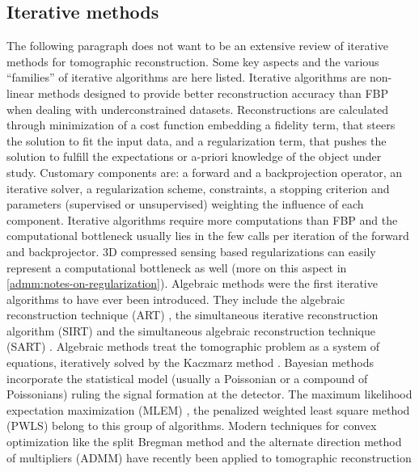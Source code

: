 {\subsection{Iterative methods}
\label{introduction:iterative-reconstruction}
The following paragraph does not want to be an extensive review of iterative methods for tomographic reconstruction. 
Some key aspects and the various ``families'' of iterative algorithms are here listed.
\newline
Iterative algorithms are non-linear methods designed to provide better reconstruction accuracy than FBP
when dealing with underconstrained datasets. Reconstructions are calculated through minimization of a cost function embedding 
a fidelity term, that steers the solution to fit the input data, and a regularization term, that pushes the solution to fulfill the 
expectations or a-priori knowledge of the object under study. Customary components are: a forward and a backprojection operator,
an iterative solver, a regularization scheme, constraints, a stopping criterion and parameters (supervised or unsupervised)
weighting the influence of each component. 
Iterative algorithms require more computations than FBP and the computational bottleneck usually lies in the few calls per iteration of 
the forward and backprojector. 3D compressed sensing based regularizations can easily represent a computational bottleneck as well
(more on this aspect in \ref{admm:notes-on-regularization}).
\newline
Algebraic methods were the first iterative algorithms to have ever been introduced. They include the algebraic reconstruction
technique (ART) \cite{Herman1973}, the simultaneous iterative reconstruction algorithm (SIRT) \cite{Gilbert1972} and the 
simultaneous algebraic reconstruction technique (SART) \cite{Andersen1984}. Algebraic methods treat the tomographic problem as a system
of equations, iteratively solved by the Kaczmarz method \cite{Kaczmarz1937}.
\newline
Bayesian methods incorporate the statistical model (usually a Poissonian or a compound of Poissonians)
ruling the signal formation at the detector.
The maximum likelihood expectation maximization (MLEM) \cite{Shepp1982},  
the penalized weighted least square method (PWLS) \cite{Fessler1994,Erdogan1999,Elbakri2002} belong to this group of algorithms.
\newline
Modern techniques for convex optimization like the split Bregman method \cite{Goldstein2009}
and the alternate direction method of multipliers (ADMM) \cite{Boyd2010} have recently been applied to tomographic reconstruction
}
